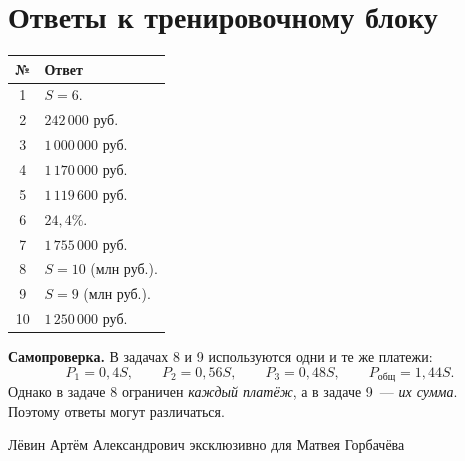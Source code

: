 \documentclass[a4paper,12pt]{article}
\renewcommand{\arraystretch}{1.28}
\newcommand{\lessonhead}[1]{\section*{\color{darkaccent}#1}}
\begin{document}
\clearpage
\lessonhead{Ответы к тренировочному блоку}
\begin{center}
\renewcommand{\arraystretch}{1.55}
\begin{tabularx}{\linewidth}{@{}c X@{}}
\toprule
\textbf{№} & \textbf{Ответ}\\
\midrule
1 & \(S=6\).\\
2 & \(242\,000\) руб.\\
3 & \(1\,000\,000\) руб.\\
4 & \(1\,170\,000\) руб.\\
5 & \(1\,119\,600\) руб.\\
6 & \(24{,}4\%\).\\
7 & \(1\,755\,000\) руб.\\
8 & \(S=10\) (млн руб.).\\
9 & \(S=9\) (млн руб.).\\
10 & \(1\,250\,000\) руб.\\
\bottomrule
\end{tabularx}
\end{center}
\vspace{7mm}
\textbf{Самопроверка.} В задачах 8 и 9 используются одни и те же платежи:
\[
P_1=0{,}4S,\qquad P_2=0{,}56S,\qquad P_3=0{,}48S,
\qquad P_{\text{общ}}=1{,}44S.
\]
Однако в задаче 8 ограничен \emph{каждый платёж}, а в задаче 9~--- \emph{их сумма}. Поэтому ответы могут различаться.
\vfill
\begin{center}
{\small\color{textgray}Лёвин Артём Александрович эксклюзивно для Матвея Горбачёва}
\end{center}
\end{document}
